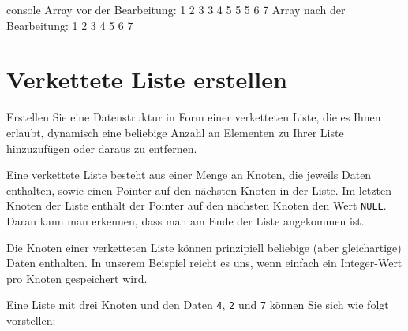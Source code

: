 \begin{mybox}[Bildschirmausgabe]{console}
Array vor der Bearbeitung:
1 2 3 3 4 5 5 5 6 7
Array nach der Bearbeitung:
1 2 3 4 5 6 7
\end{mybox}




\chapter{Verkettete Liste erstellen}

\vspace{10pt}

Erstellen Sie eine Datenstruktur in Form einer verketteten Liste, die es Ihnen
erlaubt, dynamisch eine beliebige Anzahl an Elementen zu Ihrer Liste
hinzuzufügen oder daraus zu entfernen.

Eine verkettete Liste besteht aus einer Menge an Knoten, die jeweils Daten
enthalten, sowie einen Pointer auf den nächsten Knoten in der Liste. Im letzten
Knoten der Liste enthält der Pointer auf den nächsten Knoten den Wert
\texttt{NULL}. Daran kann man erkennen, dass man am Ende der Liste
angekommen ist.

Die Knoten einer verketteten Liste können prinzipiell beliebige (aber
gleichartige) Daten enthalten. In unserem Beispiel reicht es uns, wenn einfach
ein Integer-Wert pro Knoten gespeichert wird.

Eine Liste mit drei Knoten und den Daten \texttt{4}, \texttt{2}
und \texttt{7} können Sie sich wie folgt vorstellen:

